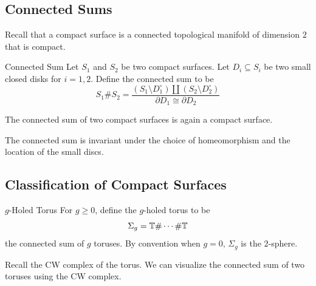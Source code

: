 \documentclass[a4paper]{article}
\begin{document}
\subsection{Connected Sums}
Recall that a compact surface is a connected topological manifold of dimension $2$ that is compact. 

\begin{defn}{Connected Sum}{} Let $S_1$ and $S_2$ be two compact surfaces. Let $D_i\subseteq S_i$ be two small closed disks for $i=1,2$. Define the connected sum to be $$S_1\# S_2=\frac{(S_1\setminus D_1^\circ)\amalg(S_2\setminus D_2^\circ)}{\partial D_1\cong\partial D_2}$$
\end{defn}

\begin{lmm}{}{} The connected sum of two compact surfaces is again a compact surface. 
\end{lmm}

\begin{prp}{}{} The connected sum is invariant under the choice of homeomorphism and the location of the small discs. 
\end{prp}

\subsection{Classification of Compact Surfaces}
\begin{defn}{$g$-Holed Torus}{} For $g\geq 0$, define the $g$-holed torus to be $$\Sigma_g=\mathbb{T}\#\cdots\#\mathbb{T}$$ the connected sum of $g$ toruses. By convention when $g=0$, $\Sigma_g$ is the $2$-sphere. 
\end{defn}

Recall the CW complex of the torus. We can visualize the connected sum of two toruses using the CW complex. 
\end{document}
